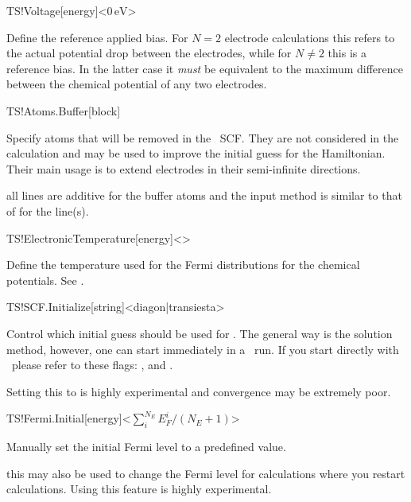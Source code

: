 \begin{fdfentry}{TS!Voltage}[energy]<$0\,\mathrm{eV}$>

  Define the reference applied bias. For $N=2$ electrode calculations
  this refers to the actual potential drop between the electrodes,
  while for $N\neq2$ this is a reference bias. In the latter case it
  \emph{must} be equivalent to the maximum difference between the
  chemical potential of any two electrodes.
  
\end{fdfentry}

\begin{fdfentry}{TS!Atoms.Buffer}[block]

  Specify atoms that will be removed in the \tsiesta\ SCF. They are
  not considered in the calculation and may be used to improve the
  initial guess for the Hamiltonian. Their main usage is to extend
  electrodes in their semi-infinite directions.

  \note all lines are additive for the buffer atoms and the input
  method is similar to that of  for the
   line(s).
  
\end{fdfentry}

\begin{fdfentry}{TS!ElectronicTemperature}[energy]<>

  Define the temperature used for the Fermi distributions for the
  chemical potentials. 
  See .

\end{fdfentry}

\begin{fdfentry}{TS!SCF.Initialize}[string]<diagon|transiesta>%

  Control which initial guess should be used for \tsiesta. The
  general way is the  solution method, however, one can
  start immediately in a \tsiesta\ run. If you start directly with
  \tsiesta\ please refer to these flags: ,
   and .
  
  \note Setting this to  is highly experimental and
  convergence may be extremely poor.

\end{fdfentry}

\begin{fdfentry}{TS!Fermi.Initial}[energy]<$\sum^{N_E}_iE_F^i/(N_E+1)$>

  Manually set the initial Fermi level to a predefined value. 

  \note this may also be used to change the Fermi level for calculations where you restart
  calculations. Using this feature is highly experimental.
  
\end{fdfentry}

